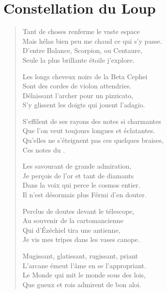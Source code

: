 \section*{Constellation du Loup}
\begin{verse}
Tant de choses renferme le vaste espace\\
Mais hélas bien peu me chaud ce qui s’y passe.\\
D’entre Balance, Scorpion, ou Centaure,\\
Seule la plus brillante étoile j’explore.

Les longs cheveux noirs de la Beta Cephei\\
Sont des cordes de violon attendries.\\
Délaissant l’archer pour un pizzicato,\\
S’y glissent les doigts qui jouent l’adagio.

S’effilent de ses rayons des notes si charmantes\\
Que l’on veut toujours longues et éclatantes.\\
Qu’elles ne s’éteignent pas ces quelques braises,\\
Ces notes du .

Les savourant de grande admiration,\\
Je perçois de l’or et tant de diamants\\
Dans la voix qui perce le cosmos entier.\\
Il n’est désormais plus Férmi d’en douter.

Perclus de doutes devant le télescope,\\
Au souvenir de la cartomancienne\\
Qui d’Ézéchiel tira une antienne,\\
Je vis mes tripes dans les vases canope.

Mugissant, glatissant, rugissant, priant\\
L’arcane émeut l’âme en se l’appropriant.\\
Le Monde qui mit le monde sous des lois,\\
Que gueux et rois admirent de bon aloi.
\end{verse}


